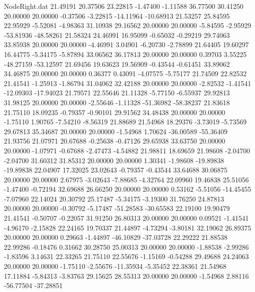\begin{filecontents}{NodeRight.dat}
  21.49191   20.37506   23.22815    -1.47400   -1.11588   36.77500   30.41250   20.00000   20.00000   -0.37506   -3.22815  -14.11964  -10.68913
  21.53257   25.84595   22.95929    -5.52081   -4.98363   31.10938   29.16562   20.00000   20.00000   -5.84595   -2.95929  -53.81936  -48.58261
  21.58324   24.46991   16.95099    -0.65032   -0.29219   29.74063   33.85938   20.00000   20.00000   -4.46991    3.04901   -6.20730   -2.78899
  21.64405   19.60297   16.44775    -5.34175   -5.87894   33.06562   36.17813   20.00000   20.00000    0.39703    3.55225  -48.27159  -53.12597
  21.69456   19.63623   19.56909    -0.43544   -0.61451   33.89062   34.46875   20.00000   20.00000    0.36377    0.43091   -4.07575   -5.75177
  21.74509   22.82532   21.41541    -1.25913   -1.86794   31.04062   32.42188   20.00000   20.00000   -2.82532   -1.41541  -12.09303  -17.94023
  21.79571   22.55646   21.11328    -5.77150   -6.55937   29.92813   31.98125   20.00000   20.00000   -2.55646   -1.11328  -51.36982  -58.38237
  21.83618   21.75110   18.09235    -0.79357   -0.90101   29.91562   34.48438   20.00000   20.00000   -1.75110    1.90765   -7.54210   -8.56319
  21.88689   21.54968   18.29376    -3.73019   -5.73569   29.67813   35.34687   20.00000   20.00000   -1.54968    1.70624  -36.00589  -55.36409
  21.93756   21.07971   20.67688    -0.25638   -0.47126   29.65938   33.63750   20.00000   20.00000   -1.07971   -0.67688   -2.47473   -4.54882
  21.98811   18.69659   21.98608    -2.04700   -2.04700   31.60312   31.85312   20.00000   20.00000    1.30341   -1.98608  -19.89838  -19.89838
  22.04907   17.32025   23.02643    -0.79357   -0.43544   33.64688   30.06875   20.00000   20.00000    2.67975   -3.02643   -7.88685   -4.32764
  22.09960   19.46838   25.51056    -1.47400   -0.72194   32.69688   26.66250   20.00000   20.00000    0.53162   -5.51056  -14.45455   -7.07960
  22.14024   20.30792   25.17487    -5.34175   -3.19300   31.76250   24.87813   20.00000   20.00000   -0.30792   -5.17487  -51.28583  -30.65583
  22.19100   19.90479   21.41541    -0.50707   -0.22057   31.91250   26.80313   20.00000   20.00000    0.09521   -1.41541   -4.96170   -2.15828
  22.24165   19.70337   21.44897    -4.73294   -3.80181   32.19062   26.89375   20.00000   20.00000    0.29663   -1.44897  -46.10829  -37.03728
  22.29222   21.88538   22.99286    -0.18476    0.31662   30.28750   25.00313   20.00000   20.00000   -1.88538   -2.99286   -1.83596    3.14631
  22.33265   21.75110   22.55676    -1.15169   -0.54288   29.49688   24.24063   20.00000   20.00000   -1.75110   -2.55676  -11.35934   -5.35452
  22.38361   21.54968   17.11884    -5.84313   -3.83763   29.15625   28.55313   20.00000   20.00000   -1.54968    2.88116  -56.77504  -37.28851

\end{filecontents}
